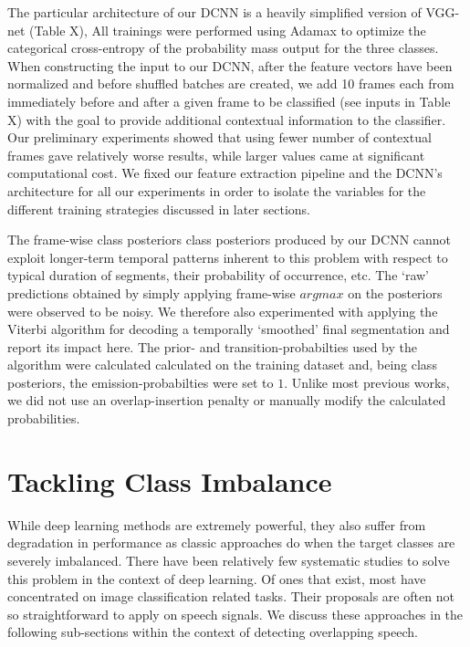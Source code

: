 \documentclass[a4paper]{article}
\begin{document}
The particular architecture of our DCNN is a heavily simplified version of VGG-net (Table X),  %
All trainings were performed using Adamax to optimize the categorical cross-entropy of the probability mass output for the three classes.
When constructing the input to our DCNN,
after the feature vectors have been normalized and before shuffled batches are created,
we add 10 frames each from immediately before and after a given frame to be classified (see inputs in Table X)  %
with the goal to provide additional contextual information to the classifier.
Our preliminary experiments showed that using fewer number of contextual frames gave relatively worse results,
while larger values came at significant computational cost.
We fixed our feature extraction pipeline and the DCNN's architecture for all our experiments in order to isolate the variables for the different training strategies discussed in later sections.

The frame-wise class posteriors class posteriors produced by our DCNN cannot exploit longer-term temporal patterns inherent to this problem with respect to typical duration of segments,
their probability of occurrence, etc.
The `raw' predictions obtained by simply applying frame-wise $argmax$ on the posteriors were observed to be noisy.
We therefore also experimented with applying the Viterbi algorithm \cite{rabiner_tutorial_1989} for decoding a temporally `smoothed' final segmentation and report its impact here.
The prior- and transition-probabilties used by the algorithm were calculated calculated on the training dataset and,
being class posteriors, the emission-probabilties were set to $1$.
Unlike most previous works,  %
we did not use an overlap-insertion penalty or manually modify the calculated probabilities.

\section{Tackling Class Imbalance} \label{sec:imbalance}
While deep learning methods are extremely powerful,
they also suffer from degradation in performance as classic approaches do when the target classes are severely imbalanced.
There have been relatively few systematic studies to solve this problem in the context of deep learning.
Of ones that exist, most have concentrated on image classification related tasks.  %
Their proposals are often not so straightforward to apply on speech signals.
We discuss these approaches in the following sub-sections within the context of detecting overlapping speech.
\end{document}
